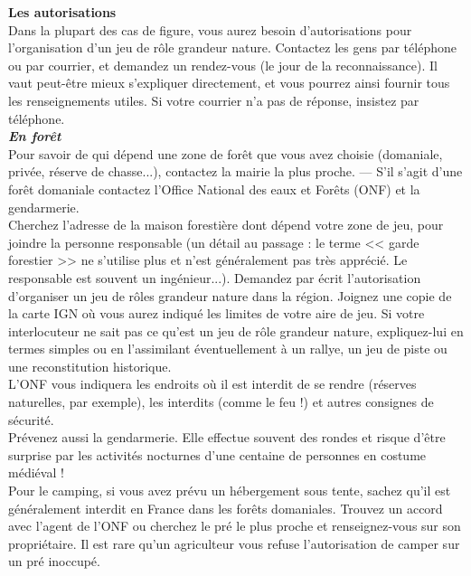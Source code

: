 \documentclass[11pt,twoside,a4paper]{article}
\begin{document}
\begin{multicols*}{2}

\textbf{\large Les autorisations}~\\

Dans la plupart des cas de figure, vous aurez besoin d'autorisations pour l'organisation d'un jeu de r{\^o}le grandeur nature. Contactez les gens par t{\'e}l{\'e}phone ou par courrier, et demandez un rendez-vous (le jour de la reconnaissance). Il vaut peut-{\^e}tre mieux s'expliquer directement, et vous pourrez ainsi fournir tous les renseignements utiles. Si votre courrier n'a pas de r{\'e}ponse, insistez par t{\'e}l{\'e}phone. ~\\

\textbf{\textit{\large En for{\^e}t}}~\\

Pour savoir de qui d{\'e}pend une zone de for{\^e}t que vous avez choisie (domaniale, priv{\'e}e, r{\'e}serve de chasse...), contactez la mairie la plus proche. --- S'il s'agit d'une for{\^e}t domaniale contactez l'Office National des eaux et For{\^e}ts (ONF) et la gendarmerie. ~\\

Cherchez l'adresse de la maison foresti{\`e}re dont d{\'e}pend votre zone de jeu, pour joindre la personne responsable (un d{\'e}tail au passage : le terme << garde forestier >> ne s'utilise plus et n'est g{\'e}n{\'e}ralement pas tr{\`e}s appr{\'e}ci{\'e}. Le responsable est souvent un ing{\'e}nieur...). Demandez par {\'e}crit l'autorisation d'organiser un jeu de r{\^o}les grandeur nature dans la r{\'e}gion. Joignez une copie de la carte IGN o{\`u} vous aurez indiqu{\'e} les limites de votre aire de jeu. Si votre interlocuteur ne sait pas ce qu'est un jeu de r{\^o}le grandeur nature, expliquez-lui en termes simples ou en l'assimilant  {\'e}ventuellement {\`a} un rallye, un jeu de piste ou une reconstitution historique. ~\\

L'ONF vous indiquera les endroits o{\`u} il est interdit de se rendre (r{\'e}serves naturelles, par exemple), les interdits (comme le feu !) et autres consignes de s{\'e}curit{\'e}. ~\\

Pr{\'e}venez aussi la gendarmerie. Elle effectue souvent des rondes et risque d'{\^e}tre surprise par les activit{\'e}s nocturnes d'une centaine de personnes en costume m{\'e}di{\'e}val ! ~\\

Pour le camping, si vous avez pr{\'e}vu un h{\'e}bergement sous tente, sachez qu'il est g{\'e}n{\'e}ralement interdit en France dans les for{\^e}ts domaniales. Trouvez un accord avec l'agent de l'ONF ou cherchez le pr{\'e} le plus proche et renseignez-vous sur son propri{\'e}taire. Il est rare qu'un agriculteur vous refuse l'autorisation de camper sur un pr{\'e} inoccup{\'e}. %


\end{multicols*}
\end{document}
